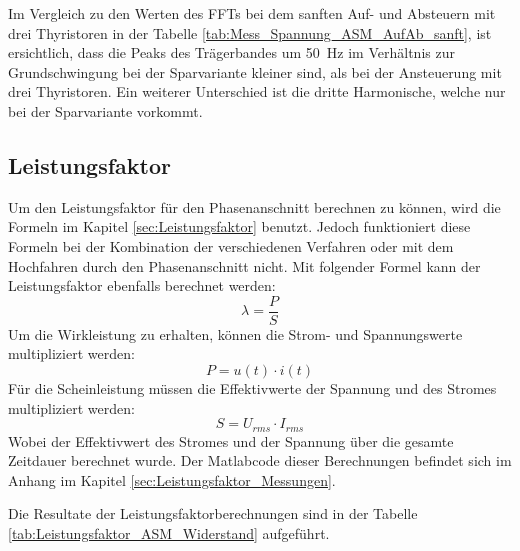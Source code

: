 Im Vergleich zu den Werten des FFTs bei dem sanften Auf- und Absteuern mit drei Thyristoren in der Tabelle \ref{tab:Mess_Spannung_ASM_AufAb_sanft}, ist ersichtlich, dass die Peaks des Trägerbandes um \SI{50}{Hz} im Verhältnis zur Grundschwingung bei der Sparvariante kleiner sind, als bei der Ansteuerung mit drei Thyristoren. Ein weiterer Unterschied ist die dritte Harmonische, welche nur bei der Sparvariante vorkommt. 


\newpage
\subsection{Leistungsfaktor}
Um den Leistungsfaktor für den Phasenanschnitt berechnen zu können, wird die Formeln im Kapitel \ref{sec:Leistungsfaktor} benutzt. Jedoch funktioniert diese Formeln bei der Kombination der verschiedenen Verfahren oder mit dem Hochfahren durch den Phasenanschnitt nicht. Mit folgender Formel kann der Leistungsfaktor ebenfalls berechnet werden:
\begin{equation}
\lambda = \frac{P}{S}
\end{equation}
Um die Wirkleistung zu erhalten, können die Strom- und Spannungswerte multipliziert werden:
\begin{equation}
P = u(t) \cdot i(t)
\end{equation}
Für die Scheinleistung müssen die Effektivwerte der Spannung und des Stromes multipliziert werden:
\begin{equation}
S = U_{rms} \cdot I_{rms}
\end{equation}
Wobei der Effektivwert des Stromes und der Spannung über die gesamte Zeitdauer berechnet wurde. Der Matlabcode dieser Berechnungen befindet sich im Anhang im Kapitel \ref{sec:Leistungsfaktor_Messungen}. 

Die Resultate der Leistungsfaktorberechnungen sind in der Tabelle \ref{tab:Leistungsfaktor_ASM_Widerstand} aufgeführt.

